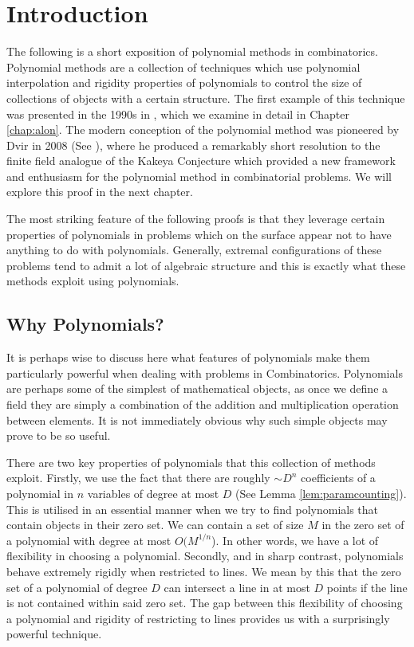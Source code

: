 \chapter{Introduction}
The following is a short exposition of polynomial methods in combinatorics. Polynomial methods are a collection of techniques which use polynomial interpolation and rigidity properties
of polynomials to control the size of collections of objects with a certain structure. 
The first example of this technique was presented in the 1990s in \cite{alon1999combinatorial},  which we examine in detail
in Chapter \ref{chap:alon}. The modern conception of the polynomial method was pioneered by Dvir in 2008 (See \cite{2008DVIR}), where he produced a remarkably short resolution to the finite field analogue of the Kakeya Conjecture which provided
a new framework and enthusiasm for the polynomial method in combinatorial problems. We will explore this proof in the next chapter. 

The most striking feature of the following proofs is that they leverage certain properties of polynomials in problems which on the surface appear not to have anything to 
do with polynomials. Generally, extremal configurations of these problems tend to admit a lot of algebraic structure and this is exactly what these methods exploit using polynomials. 


\section{Why Polynomials?}
It is perhaps wise to discuss here what features of polynomials make them particularly powerful when dealing with problems in Combinatorics. 
Polynomials are perhaps some of the simplest of mathematical objects, as once we define a field they are simply a combination of the addition and multiplication operation between elements. 
It is not immediately obvious why such simple objects may prove to be so useful.

There are two key properties of polynomials that this collection of methods exploit.
Firstly, we use the fact that there are roughly $\sim D^n$ coefficients of a polynomial in $n$ variables of degree at most $D$ (See Lemma \ref{lem:paramcounting}).  This is utilised 
in an essential manner when we try to find polynomials that contain objects in their zero set. We can contain a set of size $M$ in the zero set of
a polynomial with degree at most $O(M^{1/n}$). In other words, we have a lot of flexibility in choosing a polynomial.
Secondly, and in sharp contrast, polynomials behave extremely rigidly when restricted to lines. We mean by this that the zero set of a polynomial of degree $D$ can intersect 
a line in at most $D$ points if the line is not contained within said zero set. The gap between this flexibility of choosing a polynomial and rigidity of restricting to lines provides
us with a surprisingly powerful technique. 

